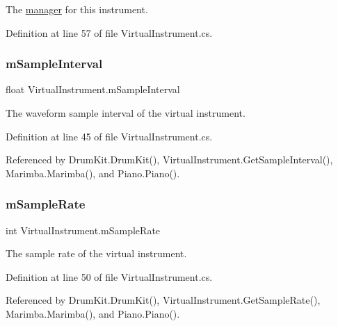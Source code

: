 The \hyperlink{group___v_i_m}{manager} for this instrument. 



Definition at line 57 of file Virtual\+Instrument.\+cs.

\mbox{\label{group___v_i_base_pro_var_ga20c1d3d25ea666378d72c833d160ae2e}} 
\subsubsection{\texorpdfstring{m\+Sample\+Interval}{mSampleInterval}}
{\footnotesize\ttfamily float Virtual\+Instrument.\+m\+Sample\+Interval\hspace{0.3cm}{\ttfamily [protected]}}



The waveform sample interval of the virtual instrument. 



Definition at line 45 of file Virtual\+Instrument.\+cs.



Referenced by Drum\+Kit.\+Drum\+Kit(), Virtual\+Instrument.\+Get\+Sample\+Interval(), Marimba.\+Marimba(), and Piano.\+Piano().

\mbox{\label{group___v_i_base_pro_var_ga80b3d2ff29b27698eea6bcf2f8ddc5d7}} 
\subsubsection{\texorpdfstring{m\+Sample\+Rate}{mSampleRate}}
{\footnotesize\ttfamily int Virtual\+Instrument.\+m\+Sample\+Rate\hspace{0.3cm}{\ttfamily [protected]}}



The sample rate of the virtual instrument. 



Definition at line 50 of file Virtual\+Instrument.\+cs.



Referenced by Drum\+Kit.\+Drum\+Kit(), Virtual\+Instrument.\+Get\+Sample\+Rate(), Marimba.\+Marimba(), and Piano.\+Piano().

